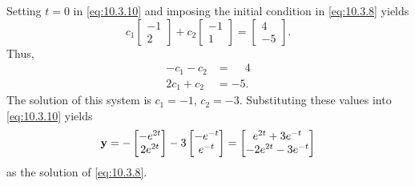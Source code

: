 \begin{alistSolution}
\item
Setting $t=0$ in \eqref{eq:10.3.10} and imposing the initial condition
in \eqref{eq:10.3.8} yields
\[
c_1\begin{bmatrix}-1 \\2\end{bmatrix}+c_2
\begin{bmatrix}-1 \\1\end{bmatrix}=
\begin{bmatrix} 4 \\-5\end{bmatrix}.
\]
Thus,
\begin{align*}
-c_1-c_2&=\phantom{-}4 \\
2c_1+c_2&=-5.
\end{align*}
The solution of this system is $c_1=-1$, $c_2=-3$.  Substituting these
values into  \eqref{eq:10.3.10} yields
\[
\mathbf{y}=-\begin{bmatrix}-e^{2t} \\ 2e^{2t}\end{bmatrix}
-3\begin{bmatrix}-e^{-t} \\ e^{-t}\end{bmatrix}
=\begin{bmatrix} e^{2t}+3e^{-t} \\-2e^{2t}-3e^{-t}\end{bmatrix}
\]
as the solution of  \eqref{eq:10.3.8}.
\end{alistSolution}

\exercises


